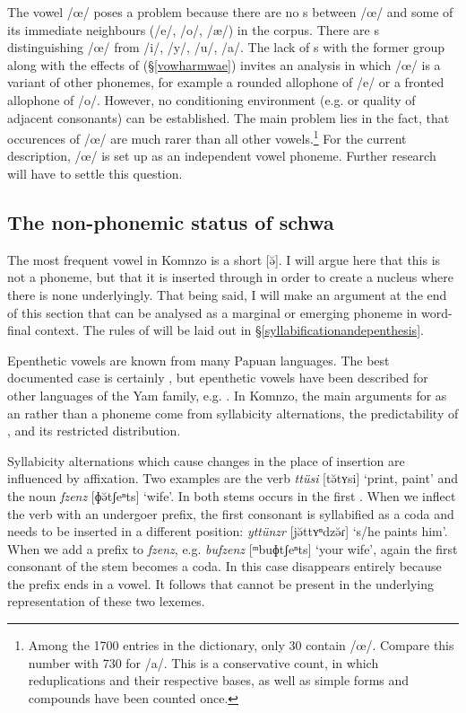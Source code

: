 The vowel /œ/ poses a problem because there are no s between /œ/ and some of its immediate neighbours (/e/, /o/, /æ/) in the corpus. There are s distinguishing /œ/ from /i/, /y/, /u/, /a/. The lack of s with the former group along with the effects of  ({\S}\ref{vowharmwae}) invites an analysis in which /œ/ is a variant of other phonemes, for example a rounded allophone of /e/ or a fronted allophone of /o/. However, no conditioning environment (e.g.  or quality of adjacent consonants) can be established. The main problem lies in the fact, that occurences of /œ/ are much rarer than all other vowels.\footnote{Among the 1700 entries in the dictionary, only 30 contain /œ/. Compare this number with 730 for /a/. This is a conservative count, in which reduplications and their respective bases, as well as simple forms and compounds have been counted once.} For the current description, /œ/ is set up as an independent vowel phoneme. Further research will have to settle this question.

\subsection{The non-phonemic status of schwa} \label{schwa-as-non-phoneme}

The most frequent vowel in Komnzo is a short  [ə̆]. I will argue here that this is not a phoneme, but that it is inserted through  in order to create a  nucleus where there is none underlyingly. That being said, I will make an argument at the end of this section that  can be analysed as a marginal or emerging phoneme in word-final context. The rules of  will be laid out in {\S}\ref{syllabificationandepenthesis}.

Epenthetic vowels are known from many Papuan languages. The best documented case is certainly  \citep{Biggs:1963wk, Pawley:1966wj, Blevins:2010ee}, but epenthetic vowels have been described for other languages of the Yam family, e.g.  \citep{Evans:ji}. In Komnzo, the main arguments for  as an  rather than a phoneme come from syllabicity alternations, the predictability of , and its restricted distribution.

Syllabicity alternations which cause changes in the place of  insertion are influenced by affixation. Two examples are the verb \emph{ttüsi} [tə̆tʏsi] `print, paint' and the noun \emph{fzenz} [ɸə̆tʃeⁿts] `wife'. In both stems  occurs in the first . When we inflect the verb with an undergoer prefix, the first consonant is syllabified as a coda and  needs to be inserted in a different position: \emph{yttünzr} [jə̆ttʏⁿdzə̆ɾ] `s/he paints him'. When we add a  prefix to \emph{fzenz}, e.g. \emph{bufzenz} [ᵐbuɸtʃeⁿts] `your wife', again the first consonant of the stem becomes a coda. In this case  disappears entirely because the  prefix ends in a vowel. It follows that  cannot be present in the underlying representation of these two lexemes.

